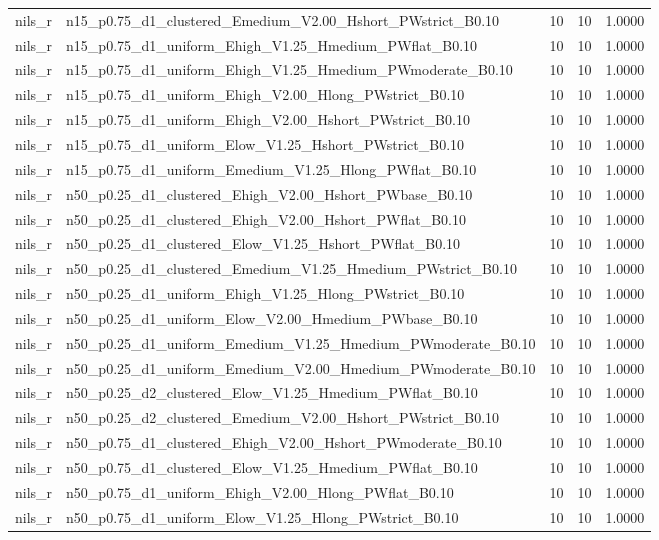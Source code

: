 \begin{tabular}{llrrr}
nils_r & n15_p0.75_d1_clustered_Emedium_V2.00_Hshort_PWstrict_B0.10 & 10 & 10 & 1.0000 \\
nils_r & n15_p0.75_d1_uniform_Ehigh_V1.25_Hmedium_PWflat_B0.10 & 10 & 10 & 1.0000 \\
nils_r & n15_p0.75_d1_uniform_Ehigh_V1.25_Hmedium_PWmoderate_B0.10 & 10 & 10 & 1.0000 \\
nils_r & n15_p0.75_d1_uniform_Ehigh_V2.00_Hlong_PWstrict_B0.10 & 10 & 10 & 1.0000 \\
nils_r & n15_p0.75_d1_uniform_Ehigh_V2.00_Hshort_PWstrict_B0.10 & 10 & 10 & 1.0000 \\
nils_r & n15_p0.75_d1_uniform_Elow_V1.25_Hshort_PWstrict_B0.10 & 10 & 10 & 1.0000 \\
nils_r & n15_p0.75_d1_uniform_Emedium_V1.25_Hlong_PWflat_B0.10 & 10 & 10 & 1.0000 \\
nils_r & n50_p0.25_d1_clustered_Ehigh_V2.00_Hshort_PWbase_B0.10 & 10 & 10 & 1.0000 \\
nils_r & n50_p0.25_d1_clustered_Ehigh_V2.00_Hshort_PWflat_B0.10 & 10 & 10 & 1.0000 \\
nils_r & n50_p0.25_d1_clustered_Elow_V1.25_Hshort_PWflat_B0.10 & 10 & 10 & 1.0000 \\
nils_r & n50_p0.25_d1_clustered_Emedium_V1.25_Hmedium_PWstrict_B0.10 & 10 & 10 & 1.0000 \\
nils_r & n50_p0.25_d1_uniform_Ehigh_V1.25_Hlong_PWstrict_B0.10 & 10 & 10 & 1.0000 \\
nils_r & n50_p0.25_d1_uniform_Elow_V2.00_Hmedium_PWbase_B0.10 & 10 & 10 & 1.0000 \\
nils_r & n50_p0.25_d1_uniform_Emedium_V1.25_Hmedium_PWmoderate_B0.10 & 10 & 10 & 1.0000 \\
nils_r & n50_p0.25_d1_uniform_Emedium_V2.00_Hmedium_PWmoderate_B0.10 & 10 & 10 & 1.0000 \\
nils_r & n50_p0.25_d2_clustered_Elow_V1.25_Hmedium_PWflat_B0.10 & 10 & 10 & 1.0000 \\
nils_r & n50_p0.25_d2_clustered_Emedium_V2.00_Hshort_PWstrict_B0.10 & 10 & 10 & 1.0000 \\
nils_r & n50_p0.75_d1_clustered_Ehigh_V2.00_Hshort_PWmoderate_B0.10 & 10 & 10 & 1.0000 \\
nils_r & n50_p0.75_d1_clustered_Elow_V1.25_Hmedium_PWflat_B0.10 & 10 & 10 & 1.0000 \\
nils_r & n50_p0.75_d1_uniform_Ehigh_V2.00_Hlong_PWflat_B0.10 & 10 & 10 & 1.0000 \\
nils_r & n50_p0.75_d1_uniform_Elow_V1.25_Hlong_PWstrict_B0.10 & 10 & 10 & 1.0000 \\

\end{tabular}

